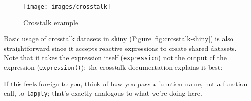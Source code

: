 \documentclass[10pt,]{krantz}
\makeatletter
\newenvironment{Shaded}{\begin{snugshade}}{\end{snugshade}}
\newcommand{\DataTypeTok}[1]{\textcolor[rgb]{0.27,0.27,0.27}{#1}}
\newcommand{\KeywordTok}[1]{\textcolor[rgb]{0.27,0.27,0.27}{\textbf{#1}}}
\newcommand{\NormalTok}[1]{#1}
\newcommand{\OperatorTok}[1]{\textcolor[rgb]{0.43,0.43,0.43}{\textbf{#1}}}
\newcommand{\StringTok}[1]{\textcolor[rgb]{0.5,0.5,0.5}{#1}}
\renewenvironment{quote}{\begin{VF}}{\end{VF}}
\newenvironment{kframe}{%
\medskip{}
\setlength{\fboxsep}{.8em}
 \def\at@end@of@kframe{}%
 \ifinner\ifhmode%
  \def\at@end@of@kframe{\end{minipage}}%
  \begin{minipage}{\columnwidth}%
 \fi\fi%
 \def\FrameCommand##1{\hskip\@totalleftmargin \hskip-\fboxsep
 \colorbox{shadecolor}{##1}\hskip-\fboxsep
     \hskip-\linewidth \hskip-\@totalleftmargin \hskip\columnwidth}%
 \MakeFramed {\advance\hsize-\width
   \@totalleftmargin\z@ \linewidth\hsize
   \@setminipage}}%
 {\par\unskip\endMakeFramed%
 \at@end@of@kframe}
\renewenvironment{Shaded}{\begin{kframe}}{\end{kframe}}
\makeatother
\begin{document}
\begin{Shaded}
\end{Shaded}

\begin{figure}[H]

{\centering \texttt{[image: images/crosstalk]} 

}

\caption{Crosstalk example}\label{fig:crosstalk-1}
\end{figure}

Basic usage of crosstalk datasets in shiny (Figure \ref{fig:crosstalk-shiny}) is also straightforward since it accepts reactive expressions to create shared datasets. Note that it takes the expression itself (\texttt{expression}) not the output of the expression (\texttt{expression()}); the crosstalk documentation explains it best:

\begin{quote}
If this feels foreign to you, think of how you pass a function name, not a function call, to \texttt{lapply}; that's exactly analogous to what we're doing here.

\end{quote}
\end{document}
